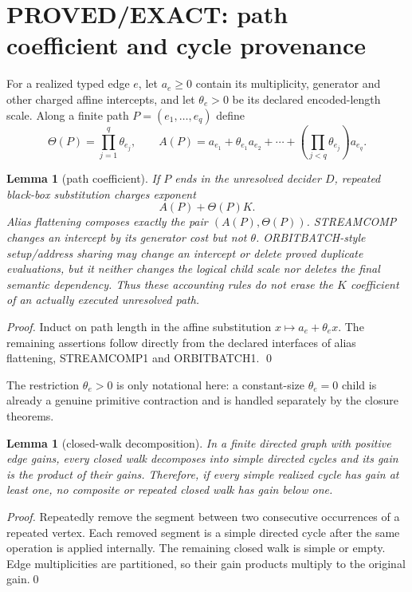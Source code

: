 \documentclass[11pt]{article}
\newtheorem{lemma}[theorem]{Lemma}
\begin{document}
\section{PROVED/EXACT: path coefficient and cycle provenance}

For a realized typed edge $e$, let $a_e\ge0$ contain its multiplicity,
generator and other charged affine intercepts, and let $\theta_e>0$ be its
declared encoded-length scale.  Along a finite path
$P=(e_1,\ldots,e_q)$ define
\[
 \Theta(P)=\prod_{j=1}^q\theta_{e_j},\qquad
 A(P)=a_{e_1}+\theta_{e_1}a_{e_2}+\cdots+
       \left(\prod_{j<q}\theta_{e_j}\right)a_{e_q}.   \tag{6}
\]

\begin{lemma}[path coefficient]
If $P$ ends in the unresolved decider $D$, repeated black-box substitution
charges exponent
\[
 A(P)+\Theta(P)K.                                      \tag{7}
\]
Alias flattening composes exactly the pair $(A(P),\Theta(P))$.
STREAMCOMP changes an intercept by its generator cost but not $\theta$.
ORBITBATCH-style setup/address sharing may change an intercept or delete
proved duplicate evaluations, but it neither changes the logical child scale
nor deletes the final semantic dependency.  Thus these accounting rules do
not erase the $K$ coefficient of an actually executed unresolved path.
\end{lemma}
\begin{proof}
Induct on path length in the affine substitution
$x\mapsto a_e+\theta_e x$.  The remaining assertions follow directly from
the declared interfaces of alias flattening, STREAMCOMP1 and ORBITBATCH1.
\qed
\end{proof}
The restriction $\theta_e>0$ is only notational here: a constant-size
$\theta_e=0$ child is already a genuine primitive contraction and is handled
separately by the closure theorems.

\begin{lemma}[closed-walk decomposition]
In a finite directed graph with positive edge gains, every closed walk
decomposes into simple directed cycles and its gain is the product of their
gains.  Therefore, if every simple realized cycle has gain at least one, no
composite or repeated closed walk has gain below one.
\end{lemma}
\begin{proof}
Repeatedly remove the segment between two consecutive occurrences of a
repeated vertex.  Each removed segment is a simple directed cycle after the
same operation is applied internally.  The remaining closed walk is simple
or empty.  Edge multiplicities are partitioned, so their gain products
multiply to the original gain.\qed
\end{proof}
\end{document}
